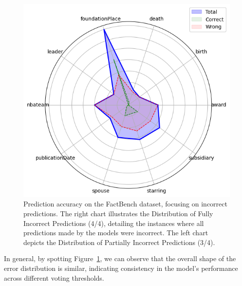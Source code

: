 \begin{figure}[ht!]
\begin{minipage}[b]{0.4\textwidth}
        \includegraphics[width=\textwidth]{res/radar-error-1}
    \end{minipage}
    \caption{Prediction accuracy on the FactBench dataset, focusing on incorrect predictions. The right chart illustrates the Distribution of Fully Incorrect Predictions (4/4), detailing the instances where all predictions made by the models were incorrect. The left chart depicts the Distribution of Partially Incorrect Predictions (3/4).}
    \label{fig:wrong_prediction_distribution}
\end{figure}

In general, by spotting Figure~\ref{fig:wrong_prediction_distribution}, we can observe that the overall shape of the error distribution is similar, indicating consistency in the model's performance across different voting thresholds.